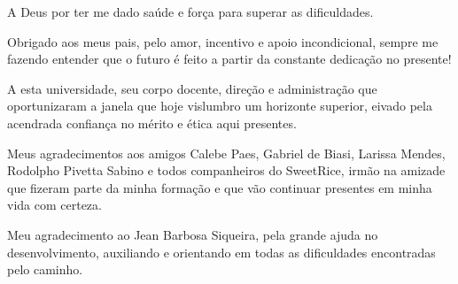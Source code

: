 \documentclass[
	12pt,				%
	openright,			%
	twoside,			%
	a4paper,			%
	chapter=TITLE,		%
	english,			%
	brazil				%
	]{abntex2}
\begin{document}









\begin{agradecimentos}

A Deus por ter me dado saúde e força para superar as dificuldades.

Obrigado aos meus pais, pelo amor, incentivo e apoio incondicional, sempre me fazendo entender que o futuro é feito a partir da constante dedicação no presente!

A esta universidade, seu corpo docente, direção e administração que oportunizaram a janela que hoje vislumbro um horizonte superior, eivado pela acendrada confiança no mérito e ética aqui presentes.


Meus agradecimentos aos amigos Calebe Paes, Gabriel de Biasi, Larissa Mendes, Rodolpho Pivetta Sabino e todos companheiros do SweetRice, irmão na amizade que fizeram parte da minha formação e que vão continuar presentes em minha vida com certeza.

Meu agradecimento ao Jean Barbosa Siqueira, pela grande ajuda no desenvolvimento, auxiliando e orientando em todas as dificuldades encontradas pelo caminho. 


\end{agradecimentos}
\end{document}
